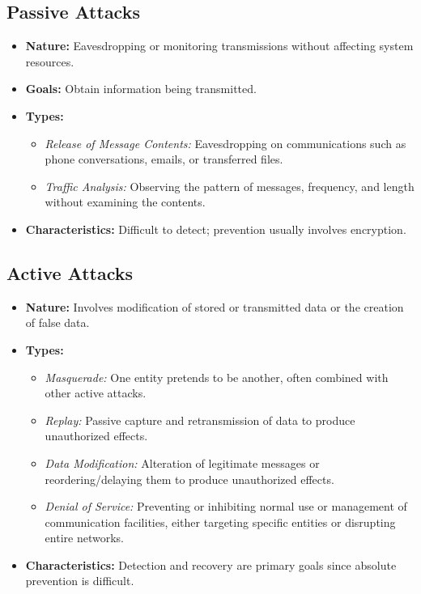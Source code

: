 \subsection{Passive Attacks}
\begin{itemize}
    \item \textbf{Nature:} Eavesdropping or monitoring transmissions without affecting system resources.
    \item \textbf{Goals:} Obtain information being transmitted.
    \item \textbf{Types:}
    \begin{itemize}
        \item \textit{Release of Message Contents:} Eavesdropping on communications such as phone conversations, emails, or transferred files.
        \item \textit{Traffic Analysis:} Observing the pattern of messages, frequency, and length without examining the contents.
    \end{itemize}
    \item \textbf{Characteristics:} Difficult to detect; prevention usually involves encryption.
\end{itemize}

\subsection{Active Attacks}
\begin{itemize}
    \item \textbf{Nature:} Involves modification of stored or transmitted data or the creation of false data.
    \item \textbf{Types:}
    \begin{itemize}
        \item \textit{Masquerade:} One entity pretends to be another, often combined with other active attacks.
        \item \textit{Replay:} Passive capture and retransmission of data to produce unauthorized effects.
        \item \textit{Data Modification:} Alteration of legitimate messages or reordering/delaying them to produce unauthorized effects.
        \item \textit{Denial of Service:} Preventing or inhibiting normal use or management of communication facilities, either targeting specific entities or disrupting entire networks.
    \end{itemize}
    \item \textbf{Characteristics:} Detection and recovery are primary goals since absolute prevention is difficult.
\end{itemize}

